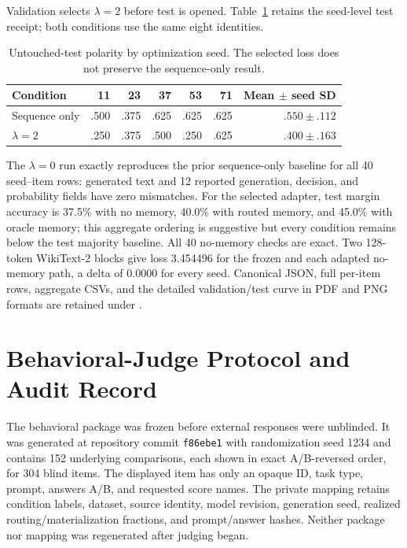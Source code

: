 \documentclass[11pt]{article}
\begin{document}
Validation selects $\lambda=2$ before test is opened. Table~\ref{tab:decision-aware-test} retains
the seed-level test receipt; both conditions use the same eight identities.

\begin{table}[H]
\centering
\small
\caption{Untouched-test polarity by optimization seed. The selected loss does not preserve the
sequence-only result.}
\label{tab:decision-aware-test}
\begin{tabular}{lrrrrrr}
\toprule
Condition & 11 & 23 & 37 & 53 & 71 & Mean $\pm$ seed SD \\
\midrule
Sequence only & .500 & .375 & .625 & .625 & .625 & $.550\pm.112$ \\
$\lambda=2$ & .250 & .375 & .500 & .250 & .625 & $.400\pm.163$ \\
\bottomrule
\end{tabular}
\end{table}

The $\lambda=0$ run exactly reproduces the prior sequence-only baseline for all 40 seed--item rows:
generated text and 12 reported generation, decision, and probability fields have zero mismatches.
For the selected adapter, test margin accuracy is 37.5\% with no memory, 40.0\% with routed memory,
and 45.0\% with oracle memory; this aggregate ordering is suggestive but every condition remains
below the test majority baseline. All 40 no-memory checks are exact. Two 128-token WikiText-2
blocks give loss 3.454496 for the frozen and each adapted no-memory path, a delta of 0.0000 for
every seed. Canonical JSON, full per-item rows, aggregate CSVs, and the detailed validation/test
curve in PDF and PNG formats are retained under
.

\section{Behavioral-Judge Protocol and Audit Record}
\label{app:behavioral-protocol}

The behavioral package was frozen before external responses were unblinded. It was generated at
repository commit \texttt{f86ebe1} with randomization seed 1234 and contains 152 underlying
comparisons, each shown in exact A/B-reversed order, for 304 blind items. The displayed item has
only an opaque ID, task type, prompt, answers A/B, and requested score names. The private mapping
retains condition labels, dataset, source identity, model revision, generation seed, realized
routing/materialization fractions, and prompt/answer hashes. Neither package nor mapping was
regenerated after judging began.
\end{document}
